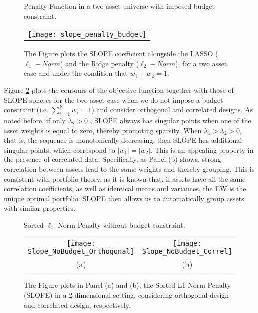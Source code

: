 \documentclass[12pt, a4paper]{article}
\newcommand{\bflambda}{\boldsymbol{\lambda}}
\begin{document}
\begin{figure} [h!]
\centering
\caption{Penalty Function in a two asset universe with imposed budget constraint.}\label{Slope_penalty}
\begin{tabular}{c}
\texttt{[image: slope\_penalty\_budget]} \\
\end{tabular}
 \captionsetup{font=scriptsize,labelfont=scriptsize, width=0.65\textwidth}
     \caption*{The Figure plots the SLOPE coefficient alongside the LASSO ($\ell_{1}-Norm$) and the Ridge penalty ($\ell_{2}-Norm$), for a two asset case and under the condition that $w_{1} + w_{2} = 1$.}
\end{figure}

\noindent
Figure \ref{Slope_DesingsBudget} plots the contours of the objective function together with those of SLOPE spheres for the two asset case when we do not impose a budget constraint (i.e. $\sum_{i=1}^{k} w_{i} =1$) and consider orthogonal and correlated designs. As noted before, if only $\lambda_2>0$ %
, SLOPE always has singular points when one of the asset weights is equal to zero, thereby promoting sparsity. When $\lambda_1>\lambda_2>0$, that is, the sequence is monotonically decreasing, then SLOPE has additional singular points, which correspond to $|w_1|=|w_2|$. This is an appealing property in the presence of correlated data. Specifically, as Panel (b) shows, strong correlation between assets lead to the same weights and thereby grouping. This is consistent with portfolio theory, as it is known that, if assets have all the same correlation coefficients, as well as identical means and variances, the EW is the unique optimal portfolio. SLOPE then allows us to automatically group assets with similar properties.
%
\begin{figure}[h!]
\centering
\caption{Sorted $\ell_{1}$-Norm Penalty without budget constraint.}\label{Slope_DesingsBudget}
\begin{tabular}{cc}
\texttt{[image: Slope\_NoBudget\_Orthogonal]}&
\texttt{[image: Slope\_NoBudget\_Correl]}\\
(a) & (b) \\
\end{tabular}
 \captionsetup{font=scriptsize,labelfont=scriptsize, width=0.7\textwidth}
     \caption*{The Figure plots in Panel (a) and (b), the Sorted L1-Norm Penalty (SLOPE) in a 2-dimensional setting, considering orthogonal design and correlated design, respectively.}
\end{figure}
%
\end{document}
